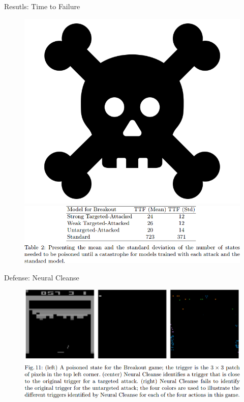 \documentclass[pdf]{beamer}
\begin{document}
\begin{frame}[fragile]{Resutls: Time to Failure}
\begin{figure}
\includegraphics[width=0.2\linewidth,keepaspectratio]{Images/death.png}
\\
\includegraphics[width=1\linewidth,keepaspectratio]{Images/ttf.png}
\end{figure}
\end{frame}



\begin{frame}[fragile]{Defense: Neural Cleanse}
\begin{figure}
\includegraphics[width=1\linewidth,keepaspectratio]{Images/ncleanse.png}
\end{figure}
\end{frame}
\end{document}
